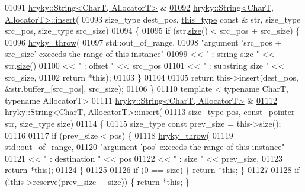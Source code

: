 \begin{DoxyCode}
01091 \hyperlink{classhryky_1_1_string}{hryky::String<CharT, AllocatorT>} &
\hypertarget{string_8h_source_l01092}{}\hyperlink{classhryky_1_1_string_af1ae40208e3a4d23ae2e1db91464aa28}{01092} \hyperlink{classhryky_1_1_string}{hryky::String<CharT, AllocatorT>::insert}(
01093     size\_type dest\_pos, \hyperlink{classhryky_1_1_string}{this_type} \textcolor{keyword}{const} & str, size\_type src\_pos, size\_type 
      src\_size)
01094 \{
01095     \textcolor{keywordflow}{if} (str.\hyperlink{classhryky_1_1_string_a9db0f71dce7b2de86a54ab5323759265}{size}() < src\_pos + src\_size) \{
01096         \hyperlink{debug__common_8h_af50606eac4009921527ddcaed392b2c2}{hryky_throw}(
01097             std::out\_of\_range,
01098             \textcolor{stringliteral}{"argument 'src\_pos + src\_size' exceeds the range of this instance"}
01099             << \textcolor{stringliteral}{" : string size "} << str.\hyperlink{classhryky_1_1_string_a9db0f71dce7b2de86a54ab5323759265}{size}()
01100             << \textcolor{stringliteral}{" : offset "} << src\_pos
01101             << \textcolor{stringliteral}{" : substring size "} << src\_size,
01102             \textcolor{keywordflow}{return} *\textcolor{keyword}{this});
01103     \}
01104 
01105     \textcolor{keywordflow}{return} this->insert(dest\_pos, &str.buffer\_[src\_pos], src\_size);
01106 \}
01110 \textcolor{keyword}{template} < \textcolor{keyword}{typename} CharT, \textcolor{keyword}{typename} AllocatorT>
01111 \hyperlink{classhryky_1_1_string}{hryky::String<CharT, AllocatorT>} &
\hypertarget{string_8h_source_l01112}{}\hyperlink{classhryky_1_1_string_ae46c7efdd4c00f15357feb208072a386}{01112} \hyperlink{classhryky_1_1_string}{hryky::String<CharT, AllocatorT>::insert}(
01113     size\_type pos, const\_pointer str, size\_type size)
01114 \{
01115     size\_type \textcolor{keyword}{const} prev\_size = this->size();
01116     
01117     \textcolor{keywordflow}{if} (prev\_size < pos) \{
01118         \hyperlink{debug__common_8h_af50606eac4009921527ddcaed392b2c2}{hryky_throw}(
01119             std::out\_of\_range,
01120             \textcolor{stringliteral}{"argument 'pos' exceeds the range of this instance"}
01121             << \textcolor{stringliteral}{" : destination "} << pos
01122             << \textcolor{stringliteral}{" : size "} << prev\_size,
01123             \textcolor{keywordflow}{return} *\textcolor{keyword}{this});
01124     \}
01125 
01126     \textcolor{keywordflow}{if} (0 == size) \{ \textcolor{keywordflow}{return} *\textcolor{keyword}{this}; \}
01127 
01128     \textcolor{keywordflow}{if} (!this->reserve(prev\_size + size)) \{ \textcolor{keywordflow}{return} *\textcolor{keyword}{this}; \}

\end{DoxyCode}
